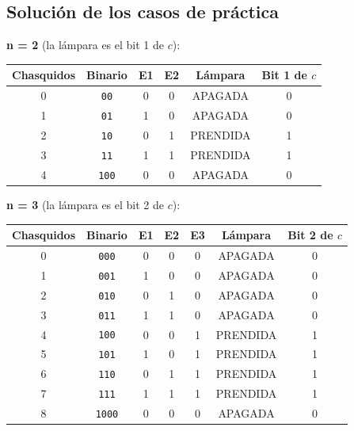 \documentclass[12pt, oneside]{article}
\begin{document}
\subsection{Solución de los casos de práctica}

\textbf{n = 2} (la lámpara es el bit 1 de $c$):

\begin{center}
\begin{tabular}{c|c|c|c|c|c}
  \toprule
  Chasquidos & Binario & E1 & E2 & Lámpara & Bit 1 de $c$ \\
  \midrule
  0 & \texttt{00} & 0 & 0 & APAGADA & 0 \\
  1 & \texttt{01} & 1 & 0 & APAGADA & 0 \\
  2 & \texttt{10} & 0 & 1 & PRENDIDA & 1 \\
  3 & \texttt{11} & 1 & 1 & PRENDIDA & 1 \\
  4 & \texttt{100} & 0 & 0 & APAGADA & 0 \\
  \bottomrule
\end{tabular}
\end{center}

\textbf{n = 3} (la lámpara es el bit 2 de $c$):

\begin{center}
\begin{tabular}{c|c|c|c|c|c|c}
  \toprule
  Chasquidos & Binario & E1 & E2 & E3 & Lámpara & Bit 2 de $c$ \\
  \midrule
  0 & \texttt{000} & 0 & 0 & 0 & APAGADA & 0 \\
  1 & \texttt{001} & 1 & 0 & 0 & APAGADA & 0 \\
  2 & \texttt{010} & 0 & 1 & 0 & APAGADA & 0 \\
  3 & \texttt{011} & 1 & 1 & 0 & APAGADA & 0 \\
  4 & \texttt{100} & 0 & 0 & 1 & PRENDIDA & 1 \\
  5 & \texttt{101} & 1 & 0 & 1 & PRENDIDA & 1 \\
  6 & \texttt{110} & 0 & 1 & 1 & PRENDIDA & 1 \\
  7 & \texttt{111} & 1 & 1 & 1 & PRENDIDA & 1 \\
  8 & \texttt{1000} & 0 & 0 & 0 & APAGADA & 0 \\
  \bottomrule
\end{tabular}
\end{center}
\end{document}
